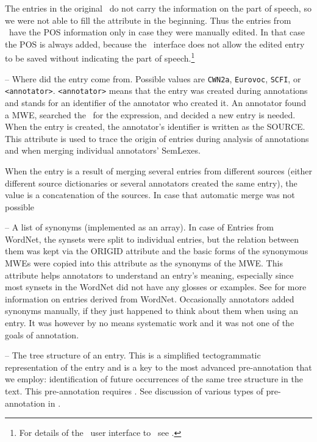 \begin{description}
The entries in the original \scfi\ do not carry the information on the part of speech, so we were not able to fill the attribute in the beginning. Thus the entries from \scfi\ have the POS information only in case they were manually edited. In that case the POS is always added, because the \seman\ interface does not allow the edited entry to be saved without indicating the part of speech.\footnote{For details of the \seman\ user interface to \semlex\ see .} %

\item [SOURCE] -- Where did the entry come from. Possible values are {\tt CWN2a}, {\tt Eurovoc}, {\tt SCFI}, or {\tt <annotator>}. {\tt <annotator>} means that the entry was created during annotations and stands for an identifier of the annotator who created it. An annotator found a MWE, searched the \semlex\ for the expression, and decided a new entry is needed. When the entry is created, the annotator's identifier is written as the SOURCE. This attribute is used to trace the origin of entries during analysis of annotations and when merging individual annotators' SemLexes. 

When the entry is a result of merging several entries from different sources (either different source dictionaries or several annotators created the same entry), the value is a concatenation of the sources. In case that automatic merge was not possible  

\item [SYNONYMS] -- A list of synonyms (implemented as an array). In case of Entries from WordNet, the synsets were split to individual entries, but the relation between them was kept via the ORIGID attribute and the basic forms of the synonymous MWEs were copied into this attribute as the synonyms of the MWE. This attribute helps annotators to understand an entry's meaning, especially since most synsets in the WordNet did not have any glosses or examples. See  for more information on entries derived from WordNet. Occasionally annotators added synonyms manually, if they just happened to think about them when using an entry. It was however by no means systematic work and it was not one of the goals of annotation.

\item [TREE\textunderscore{}STRUCT] -- The tree structure of an entry. This is a simplified tectogrammatic representation of the entry and is a key to the most advanced pre-annotation that we employ: identification of future occurrences of the same tree structure in the text. This pre-annotation requires \ntred. See discussion of various types of pre-annotation in .

\end{description} %


